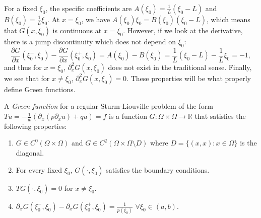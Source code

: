 For a fixed $\xi_0$, the specific coefficients are $A(\xi_0)=\frac{1}{L}(\xi_{0}-L)$ and $B(\xi_0)=\frac{1}{L}\xi_{0}$. At $x=\xi_0$, we have $A(\xi_{0})\xi_{0} = B(\xi_{0})(\xi_{0}-L)$, which means that $G(x, \xi_0)$ is continuous at $x=\xi_0$. However, if we look at the derivative, there is a jump discontinuity which does not depend on $\xi_0$:
\begin{equation}
    \frac{\partial G}{\partial x}(\xi_{0}^{-},\xi_{0})-\frac{\partial G}{\partial x}(\xi_{0}^{+},\xi_{0})=A(\xi_{0})-B(\xi_{0}) = \frac{1}{L}(\xi_{0}-L)-\frac{1}{L}\xi_{0}=-1,
\end{equation}
and thus for $x = \xi_0$, $\partial_x^2 G(x, \xi_0)$ does not exist in the traditional sense. Finally, we see that for $x \neq \xi_0$, $\partial_x^2 G(x, \xi_0) = 0$. These properties will be what properly define Green functions. 
\begin{definition}\label{def:green-function}
A \emph{Green function} for a regular Sturm-Liouville problem of the form $Tu=-\frac{1}{w}(\partial_{x}(p\partial_{x}u)+qu)=f$ is a function $G:\Omega\times\Omega\to\mathbb{R}$ that satisfies the following properties: 
\begin{enumerate}
     \item $G\in C^{0}(\Omega\times\Omega)$ and $G\in C^{2}(\Omega\times\Omega \setminus D)$ where $D=\{(x,x):x\in\Omega\}$ is the diagonal. 
     \item For every fixed $\xi_0$, $G(\cdot, \xi_0)$ satisfies the boundary conditions. 
     \item $T G(\cdot, \xi_0) = 0$ for $x \neq \xi_0$.
     \item $\partial_{x}G(\xi_{0}^{-},\xi_{0})-\partial_{x}G(\xi_{0}^{+},\xi_{0})=\frac{1}{p(\xi_{0})}$ $\forall \xi_0\in(a,b)$.
\end{enumerate}
\end{definition}

